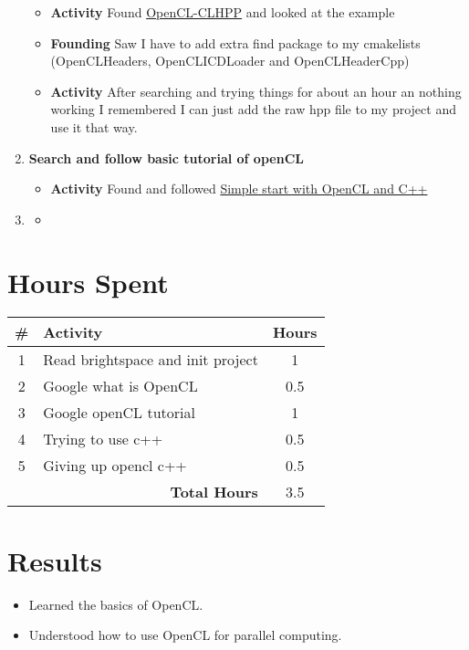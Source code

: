 \documentclass{article}
\begin{document}
\begin{enumerate}
    \begin{itemize}
        \item \textbf{Activity} Found \href{https://github.com/KhronosGroup/OpenCL-CLHPP}{OpenCL-CLHPP} and looked at the example
        \item \textbf{Founding} Saw I have to add extra find package to my cmakelists (OpenCLHeaders, OpenCLICDLoader and OpenCLHeaderCpp)
        \item \textbf{Activity} After searching and trying things for about an hour an nothing working I remembered I can just add the raw hpp file to my project and use it that way.
    \end{itemize}
    \item \textbf{Search and follow basic tutorial of openCL}
    \begin{itemize}
        \item \textbf{Activity} Found and followed \href{https://programmerclick.com/article/47811146604/}{Simple start with OpenCL and C++}
    \end{itemize}
    \item \textbf{}
    \begin{itemize}
        \item \textbf{}
    \end{itemize}
\end{enumerate}

\section*{Hours Spent}
\begin{tabular}{|c|l|c|}
    \hline
    \# & Activity & Hours \\
    \hline
    1 & Read brightspace and init project & 1 \\
    2 & Google what is OpenCL & 0.5 \\
    3 & Google openCL tutorial & 1 \\
    4 & Trying to use c++ & 0.5 \\
    5 & Giving up opencl c++ & 0.5 \\
    \hline
    \multicolumn{2}{|r|}{\textbf{Total Hours}} & 3.5 \\
    \hline
\end{tabular}

\section*{Results}
\begin{itemize}
    \item Learned the basics of OpenCL.
    \item Understood how to use OpenCL for parallel computing.
\end{itemize}
\end{document}
